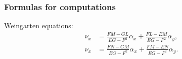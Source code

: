 \documentclass{../exp}
\def\a{\alpha}
\begin{document}


\subsubsection{Formulas for computations}


Weingarten equations:
\begin{align*}
\nu_x&=\frac{FM-GL}{EG-F^2}\a_x+\frac{FL-EM}{EG-F^2}\a_y,\\
\nu_x&=\frac{FN-GM}{EG-F^2}\a_x+\frac{FM-EN}{EG-F^2}\a_y.
\end{align*}
\end{document}
